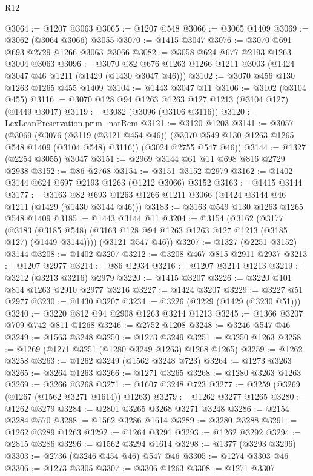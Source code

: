 \begin{lexlean}{R12}
\begin{coremodule}
@3064 := @1207 @3063
@3065 := @1207 @548
@3066 := @3065 @1409
@3069 := @3062 (@3064 @3066) @3055
@3070 := @1415 @3047
@3076 := @3070 @691 @693 @2729 @1266 @3063 @3066
@3082 := @3058 @624 @677 @2193 @1263 @3004 @3063
@3096 := @3070 @82 @676 @1263 @1266 @1211 @3003 (@1424 @3047 @46 @1211 (@1429 (@1430 @3047 @46)))
@3102 := @3070 @456 @130 @1263 @1265 @455 @1409
@3104 := @1443 @3047 @11
@3106 := @3102 (@3104 @455)
@3116 := @3070 @128 @94 @1263 @1263 @127 @1213 (@3104 @127) (@1449 @3047)
@3119 := @3082 (@3096 (@3106 @3116))
@3120 := LexLeanPreservation.prim_natRem
@3121 := @3120 @1203
@3141 := @3057
    (@3069
      (@3076 (@3119 (@3121 @454 @46)) (@3070 @549 @130 @1263 @1265 @548 @1409 (@3104 @548) @3116))
      (@3024 @2755 @547 @46))
@3144 := @1327 (@2254 @3055) @3047
@3151 := @2969 @3144 @61 @11 @698 @816 @2729 @2938
@3152 := @86 @2768
@3154 := @3151 @3152 @2979
@3162 := @1402 @3144 @624 @697 @2193 @1263 (@1212 @3066) @3152
@3163 := @1415 @3144
@3177 := @3163 @82 @693 @1263 @1266 @1211 @3066 (@1424 @3144 @46 @1211 (@1429 (@1430 @3144 @46)))
@3183 := @3163 @549 @130 @1263 @1265 @548 @1409
@3185 := @1443 @3144 @11
@3204 := @3154
    (@3162
      (@3177
        (@3183 (@3185 @548) (@3163 @128 @94 @1263 @1263 @127 @1213 (@3185 @127) (@1449 @3144))))
      (@3121 @547 @46))
@3207 := @1327 (@2251 @3152) @3144
@3208 := @1402 @3207
@3212 := @3208 @467 @815 @2911 @2937
@3213 := @1207 @2977
@3214 := @86 @2934
@3216 := @1207 @3214 @1213
@3219 := @3212 (@3213 @3216) @2979
@3220 := @1415 @3207
@3226 := @3220 @101 @814 @1263 @2910 @2977 @3216
@3227 := @1424 @3207
@3229 := @3227 @51 @2977
@3230 := @1430 @3207
@3234 := @3226 (@3229 (@1429 (@3230 @51)))
@3240 := @3220 @812 @94 @2908 @1263 @3214 @1213
@3245 := @1366 @3207 @709 @742 @811 @1268
@3246 := @2752 @1208
@3248 := @3246 @547 @46
@3249 := @1563 @3248
@3250 := @1273 @3249
@3251 := @3250 @1263
@3258 := @1269 (@1271 @3251 (@1280 @3249 @1263) @1268 @1265)
@3259 := @1262 @3258
@3263 := @1262 @3249 (@1562 @3248 @723)
@3264 := @1273 @3263
@3265 := @3264 @1263
@3266 := @1271 @3265
@3268 := @1280 @3263 @1263
@3269 := @3266 @3268
@3271 := @1607 @3248 @723
@3277 := @3259 (@3269 (@1267 (@1562 @3271 @1614)) @1263)
@3279 := @1262 @3277 @1265
@3280 := @1262 @3279
@3284 := @2801 @3265 @3268 @3271 @3248
@3286 := @2154 @3284 @570
@3288 := @1562 @3286 @1614
@3289 := @3280 @3288
@3291 := @1262 @3289 @1263
@3292 := @1264 @3291
@3293 := @1262 @3292
@3294 := @2815 @3286
@3296 := @1562 @3294 @1614
@3298 := @1377 (@3293 @3296)
@3303 := @2736 (@3246 @454 @46) @547 @46
@3305 := @1274 @3303 @46
@3306 := @1273 @3305
@3307 := @3306 @1263
@3308 := @1271 @3307

\end{coremodule}
\end{lexlean}
